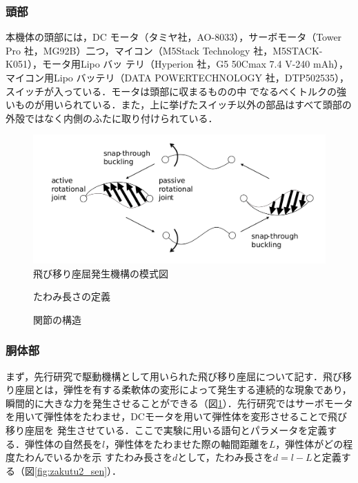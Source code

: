 \subsubsection{頭部}
本機体の頭部には，DC モータ（タミヤ社，AO-8033），サーボモータ（Tower Pro 社，MG92B）二つ，マイコン（M5Stack Technology 社，M5STACK-K051），モータ用Lipo バッ
テリ（Hyperion 社，G5 50Cmax 7.4 V-240 mAh），マイコン用Lipo バッテリ（DATA POWERTECHNOLOGY 社，DTP502535），スイッチが入っている．モータは頭部に収まるものの中
でなるべくトルクの強いものが用いられている．また，上に挙げたスイッチ以外の部品はすべて頭部の外殻ではなく内側のふたに取り付けられている．

\begin{figure}[t]
    \centering
    \includegraphics[width=0.6\linewidth]{chapters/picture/zakutu1.png}
    \caption{飛び移り座屈発生機構の模式図\cite{kyu}}
    \label{fig:zakutu1_sen}
\end{figure}

\begin{figure}[t]
    \centering
     \begin{minipage}[b]{0.45\linewidth}
        \centering
        \caption{たわみ長さの定義\cite{kyu}}
        \label{fig:zakutu2_sen}
     \end{minipage}
     \begin{minipage}[b]{0.25\linewidth}
        \centering
        \caption{関節の構造\cite{kyu}}
        \label{fig:kansetu}
     \end{minipage}
\end{figure}

\subsubsection{胴体部}
まず，先行研究\cite{kyu}で駆動機構として用いられた飛び移り座屈について記す．飛び移り座屈とは，弾性を有する柔軟体の変形によって発生する連続的な現象であり，
瞬間的に大きな力を発生させることができる（図\ref{fig:zakutu1_sen}）．先行研究ではサーボモータを用いて弾性体をたわませ，DCモータを用いて弾性体を変形させることで飛び移り座屈を
発生させている．ここで実験に用いる語句とパラメータを定義する．弾性体の自然長を$l$，弾性体をたわませた際の軸間距離を$L$，弾性体がどの程度たわんでいるかを示
すたわみ長さを$d$として，たわみ長さを$d=l−L$と定義する（図\ref{fig:zakutu2_sen}）．

